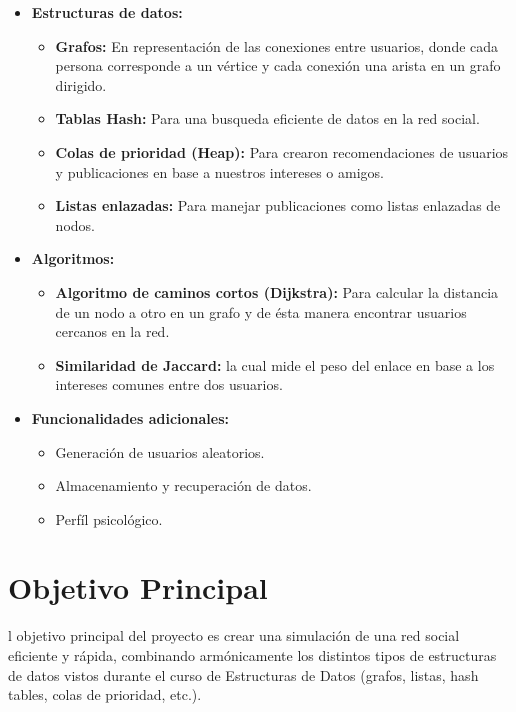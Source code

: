 \documentclass[9pt,letterpaper,onecolumn]{rho-class/rho}
\begin{document}
\begin{itemize}

\item \textbf{Estructuras de datos:}
\begin{itemize}
\item \textbf{Grafos:} En representación de las conexiones entre usuarios, donde cada persona corresponde a un vértice y cada conexión una arista en un grafo dirigido.
\item \textbf{Tablas Hash:} Para una busqueda eficiente de datos en la red social.
\item \textbf{Colas de prioridad (Heap):} Para crearon recomendaciones de usuarios y publicaciones en base a nuestros intereses o amigos.
\item \textbf{Listas enlazadas:} Para manejar publicaciones como listas enlazadas de nodos.
\end{itemize}
\item \textbf{Algoritmos:}
\begin{itemize}
\item \textbf{Algoritmo de caminos cortos (Dijkstra):} Para calcular la distancia de un nodo a otro en un grafo y de ésta manera encontrar usuarios cercanos en la red.
\item \textbf{Similaridad de Jaccard:} la cual mide el peso del enlace en base a los intereses comunes entre dos usuarios.
\end{itemize}
\item \textbf{Funcionalidades adicionales:}
\begin{itemize}
\item Generación de usuarios aleatorios.
\item Almacenamiento y recuperación de datos.
\item Perfíl psicológico.
\end{itemize}

\end{itemize}

\section{Objetivo Principal}
	l objetivo principal del proyecto es crear una simulación de una red social eficiente y rápida, combinando armónicamente los distintos tipos de estructuras de datos vistos durante el curso de Estructuras de Datos (grafos, listas, hash tables, colas de prioridad, etc.).
\end{document}
